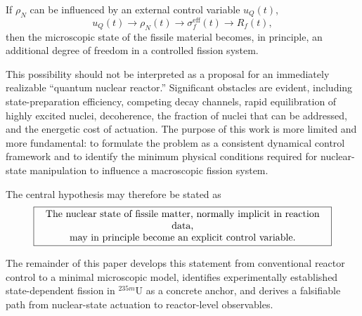 If $\rho_N$ can be influenced by an external control variable $u_Q(t)$,
\begin{equation}
u_Q(t)
\longrightarrow
\rho_N(t)
\longrightarrow
\sigma_f^{\mathrm{eff}}(t)
\longrightarrow
R_f(t),
\label{eq:central_chain_intro}
\end{equation}
then the microscopic state of the fissile material becomes, in principle, an additional degree of freedom in a controlled fission system.

This possibility should not be interpreted as a proposal for an immediately realizable ``quantum nuclear reactor.'' Significant obstacles are evident, including state-preparation efficiency, competing decay channels, rapid equilibration of highly excited nuclei, decoherence, the fraction of nuclei that can be addressed, and the energetic cost of actuation. The purpose of this work is more limited and more fundamental: to formulate the problem as a consistent dynamical control framework and to identify the minimum physical conditions required for nuclear-state manipulation to influence a macroscopic fission system.

The central hypothesis may therefore be stated as
\begin{equation}
\boxed{
\begin{minipage}{0.86\columnwidth}
\centering
The nuclear state of fissile matter, normally implicit in reaction data,\\
may in principle become an explicit control variable.
\end{minipage}
}
\end{equation}

The remainder of this paper develops this statement from conventional reactor control to a minimal microscopic model, identifies experimentally established state-dependent fission in $^{235m}$U as a concrete anchor, and derives a falsifiable path from nuclear-state actuation to reactor-level observables.

